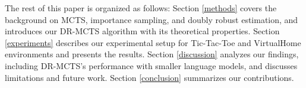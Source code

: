 The rest of this paper is organized as follows: Section \ref{methods} covers the background on MCTS, importance sampling, and doubly robust estimation, and introduces our DR-MCTS algorithm with its theoretical properties. Section \ref{experiments} describes our experimental setup for Tic-Tac-Toe and VirtualHome environments and presents the results. Section \ref{discussion} analyzes our findings, including DR-MCTS's performance with smaller language models, and discusses limitations and future work. Section \ref{conclusion} summarizes our contributions.